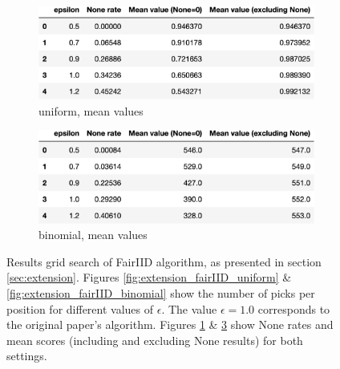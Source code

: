 \begin{figure}[ht]
  \begin{subfigure}[t]{.5\textwidth}
    \centering
    \includegraphics[width=\linewidth]{Images/extension/FairIIDProphet_uniform_table.jpeg}
    \caption{uniform, mean values}
    \label{fig:extension_fairIID_uniform_table}
  \end{subfigure}
  \hfill
  \begin{subfigure}[t]{.5\textwidth}
    \centering
    \includegraphics[width=\linewidth]{Images/extension/FairIIDProphet_binomial_table.jpeg}
    \caption{binomial, mean values}
    \label{fig:extension_fairIID_binomial_table}
  \end{subfigure}

  \caption{
  Results grid search of FairIID algorithm, as presented in section \ref{sec:extension}. Figures \ref{fig:extension_fairIID_uniform} \& \ref{fig:extension_fairIID_binomial} show the number of picks per position for different values of $\epsilon$. The value $\epsilon = 1.0$ corresponds to the original paper's algorithm. Figures \ref{fig:extension_fairIID_uniform_table} \& \ref{fig:extension_fairIID_binomial_table} show None rates and mean scores (including and excluding None results) for both settings.
  }
\end{figure}
